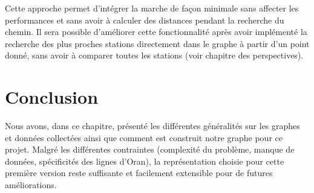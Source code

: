 Cette approche permet d'intégrer la marche de façon minimale sans affecter les performances et sans avoir à calculer des distances pendant la recherche du chemin.
Il sera possible d'améliorer cette fonctionnalité après avoir implémenté la recherche des plus proches stations directement dans le graphe à partir d'un point donné, sans avoir à comparer toutes les stations (voir chapitre des perspectives).

\section{Conclusion}
Nous avons, dans ce chapitre, présenté les différentes généralités sur les graphes et données collectées ainsi que comment est construit notre graphe pour ce projet.
Malgré les différentes contraintes (complexité du problème, manque de données, spécificités des lignes d'Oran), la représentation choisie pour cette première version reste suffisante et facilement extensible pour de futures améliorations.
\newpage
